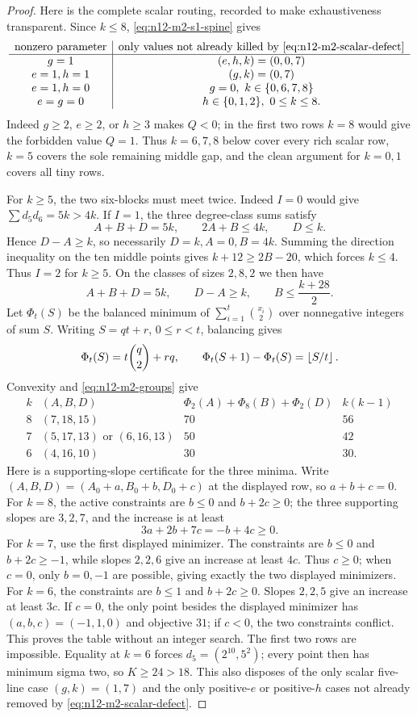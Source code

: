 \begin{proof}
Here is the complete scalar routing, recorded to make exhaustiveness
transparent.  Since $k\le8$, \eqref{eq:n12-m2-s1-spine} gives
\[
\begin{array}{c|c}
\text{nonzero parameter}&\text{only values not already killed by
\eqref{eq:n12-m2-scalar-defect}}\\ \hline
g=1&(e,h,k)=(0,0,7)\\
e=1,h=1&(g,k)=(0,7)\\
e=1,h=0&g=0,\ k\in\{0,6,7,8\}\\
e=g=0&h\in\{0,1,2\},\ 0\le k\le8.
\end{array}
\]
Indeed $g\ge2$, $e\ge2$, or $h\ge3$ makes $Q<0$; in the first two rows
$k=8$ would give the forbidden value $Q=1$.  Thus $k=6,7,8$ below cover
every rich scalar row, $k=5$ covers the sole remaining middle gap, and the
clean argument for $k=0,1$ covers all tiny rows.

For $k\ge5$, the two six-blocks must meet twice.  Indeed $I=0$ would give
$\sum d_5d_6=5k>4k$.  If $I=1$, the three degree-class sums satisfy
\[
A+B+D=5k,\qquad2A+B\le4k,\qquad D\le k.
\]
Hence $D-A\ge k$, so necessarily $D=k,A=0,B=4k$.  Summing the direction
inequality on the ten middle points gives $k+12\ge2B-20$, which forces
$k\le4$.  Thus $I=2$ for
$k\ge5$.  On the classes of sizes $2,8,2$ we then have
\begin{equation}\label{eq:n12-m2-groups}
A+B+D=5k,\qquad D-A\ge k,\qquad B\le\frac{k+28}{2}.
\end{equation}
Let $\Phi_t(S)$ be the balanced minimum of
$\sum_{i=1}^t\binom{x_i}{2}$ over nonnegative integers of sum $S$.
Writing $S=qt+r$, $0\le r<t$, balancing gives
\[
 \Phi_t(S)=t\binom q2+rq,\qquad
 \Phi_t(S+1)-\Phi_t(S)=\left\lfloor S/t\right\rfloor.
\]
Convexity and \eqref{eq:n12-m2-groups} give
\[
\begin{array}{c|c|c|c}
k&(A,B,D)&\Phi_2(A)+\Phi_8(B)+\Phi_2(D)&k(k-1)\\ \hline
8&(7,18,15)&70&56\\
7&(5,17,13)\text{ or }(6,16,13)&50&42\\
6&(4,16,10)&30&30.
\end{array}
\]
Here is a supporting-slope certificate for the three minima.  Write
$(A,B,D)=(A_0+a,B_0+b,D_0+c)$ at the displayed row, so
$a+b+c=0$.  For $k=8$, the active constraints are
$b\le0$ and $b+2c\ge0$; the three supporting slopes are $3,2,7$, and the
increase is at least
\[
 3a+2b+7c=-b+4c\ge0.
\]
For $k=7$, use the first displayed minimizer.  The constraints are
$b\le0$ and $b+2c\ge-1$, while slopes $2,2,6$ give an increase at least
$4c$.  Thus $c\ge0$; when $c=0$, only $b=0,-1$ are possible, giving exactly
the two displayed minimizers.  For $k=6$, the constraints are
$b\le1$ and $b+2c\ge0$.  Slopes $2,2,5$ give an increase at least $3c$.
If $c=0$, the only point besides the displayed minimizer has
$(a,b,c)=(-1,1,0)$ and objective $31$; if $c<0$, the two constraints
conflict.  This proves the table without an integer search.
The first two rows are impossible.  Equality at $k=6$ forces
$d_5=(2^{10},5^2)$; every point then has minimum sigma two, so
$K\ge24>18$.  This also disposes of the only scalar five-line case
$(g,k)=(1,7)$ and the only positive-$e$ or positive-$h$ cases not already
removed by \eqref{eq:n12-m2-scalar-defect}.


\end{proof}
